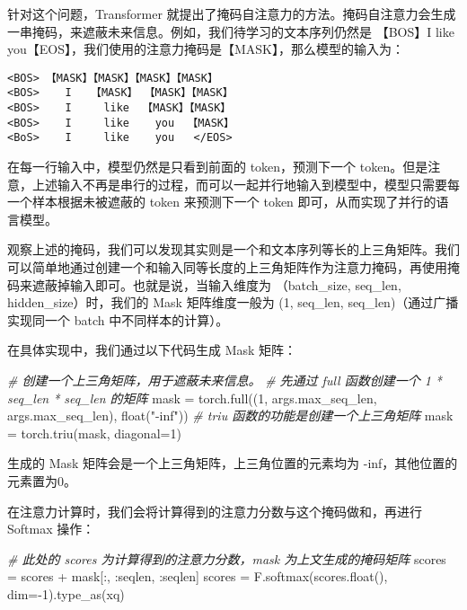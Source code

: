 \documentclass[
]{article}
\newenvironment{Shaded}{}{}
\newcommand{\BuiltInTok}[1]{\textcolor[rgb]{0.00,0.50,0.00}{#1}}
\newcommand{\CommentTok}[1]{\textcolor[rgb]{0.38,0.63,0.69}{\textit{#1}}}
\newcommand{\DecValTok}[1]{\textcolor[rgb]{0.25,0.63,0.44}{#1}}
\newcommand{\NormalTok}[1]{#1}
\newcommand{\OperatorTok}[1]{\textcolor[rgb]{0.40,0.40,0.40}{#1}}
\newcommand{\StringTok}[1]{\textcolor[rgb]{0.25,0.44,0.63}{#1}}
\begin{document}
针对这个问题，Transformer
就提出了掩码自注意力的方法。掩码自注意力会生成一串掩码，来遮蔽未来信息。例如，我们待学习的文本序列仍然是
【BOS】I like
you【EOS】，我们使用的注意力掩码是【MASK】，那么模型的输入为：

\begin{verbatim}
<BOS> 【MASK】【MASK】【MASK】【MASK】
<BOS>    I   【MASK】 【MASK】【MASK】
<BOS>    I     like  【MASK】【MASK】
<BOS>    I     like    you  【MASK】
<BoS>    I     like    you   </EOS>
\end{verbatim}

在每一行输入中，模型仍然是只看到前面的 token，预测下一个
token。但是注意，上述输入不再是串行的过程，而可以一起并行地输入到模型中，模型只需要每一个样本根据未被遮蔽的
token 来预测下一个 token 即可，从而实现了并行的语言模型。

观察上述的掩码，我们可以发现其实则是一个和文本序列等长的上三角矩阵。我们可以简单地通过创建一个和输入同等长度的上三角矩阵作为注意力掩码，再使用掩码来遮蔽掉输入即可。也就是说，当输入维度为
（batch\_size, seq\_len, hidden\_size）时，我们的 Mask 矩阵维度一般为
(1, seq\_len, seq\_len)（通过广播实现同一个 batch 中不同样本的计算）。

在具体实现中，我们通过以下代码生成 Mask 矩阵：

\begin{Shaded}
\begin{Highlighting}[]
\CommentTok{\# 创建一个上三角矩阵，用于遮蔽未来信息。}
\CommentTok{\# 先通过 full 函数创建一个 1 * seq\_len * seq\_len 的矩阵}
\NormalTok{mask }\OperatorTok{=}\NormalTok{ torch.full((}\DecValTok{1}\NormalTok{, args.max\_seq\_len, args.max\_seq\_len), }\BuiltInTok{float}\NormalTok{(}\StringTok{"{-}inf"}\NormalTok{))}
\CommentTok{\# triu 函数的功能是创建一个上三角矩阵}
\NormalTok{mask }\OperatorTok{=}\NormalTok{ torch.triu(mask, diagonal}\OperatorTok{=}\DecValTok{1}\NormalTok{)}
\end{Highlighting}
\end{Shaded}

生成的 Mask 矩阵会是一个上三角矩阵，上三角位置的元素均为
-inf，其他位置的元素置为0。

在注意力计算时，我们会将计算得到的注意力分数与这个掩码做和，再进行
Softmax 操作：

\begin{Shaded}
\begin{Highlighting}[]
\CommentTok{\# 此处的 scores 为计算得到的注意力分数，mask 为上文生成的掩码矩阵}
\NormalTok{scores }\OperatorTok{=}\NormalTok{ scores }\OperatorTok{+}\NormalTok{ mask[:, :seqlen, :seqlen]}
\NormalTok{scores }\OperatorTok{=}\NormalTok{ F.softmax(scores.}\BuiltInTok{float}\NormalTok{(), dim}\OperatorTok{={-}}\DecValTok{1}\NormalTok{).type\_as(xq)}
\end{Highlighting}
\end{Shaded}
\end{document}
